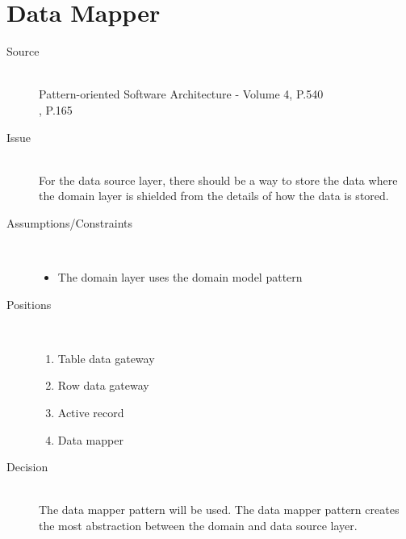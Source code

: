 \section{Data Mapper}
\begin{description}

\item [Source]~\\ 
 Pattern-oriented Software Architecture - Volume 4, P.540 \cite{wiley-4} \\
 \EAA, P.165 \cite{eaa}


\item [Issue]~\\
For the data source layer, there should be a way to store the data where the domain layer is shielded from the details of how the data is stored.

\item [Assumptions/Constraints]~
\begin{itemize}
\item The domain layer uses the domain model pattern
\end{itemize}

\item [Positions]~
\begin{enumerate}
\item Table data gateway%
\item Row data gateway%
\item Active record %
\item Data mapper%
\end{enumerate}

\item [Decision] ~\\
The data mapper pattern will be used. The data mapper pattern creates the most abstraction between the domain and data source layer.


\end{description}
